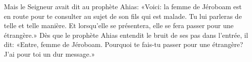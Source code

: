 Mais le Seigneur avait dit au prophète Ahias:
	«Voici: la femme de Jéroboam est en route
	pour te consulter au sujet de son fils qui est malade.
	Tu lui parleras de telle et telle manière.
Et lorsqu’elle se présentera, elle se fera passer pour une étrangère.»
Dès que le prophète Ahias entendit le bruit de ses pas dans l’entrée, il dit:
	«Entre, femme de Jéroboam.
Pourquoi te fais-tu passer pour une étrangère?
	J’ai pour toi un dur message.»
